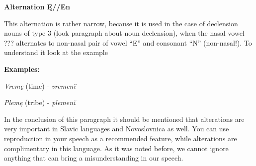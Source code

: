 
\textbf{Alternation Ę//En}

This alternation is rather narrow, because it is used in the case of declension nouns of type 3 (look paragraph about noun declension), when the nasal vowel ??? alternates to non-nasal pair of vowel “E” and consonant “N” (non-nasal!). To understand it look at the example

\textbf{Examples:}

\textit{Vremę} (time) \textipa{[‘vrEmj\~E]} - \textit{vremenï} 

\textit{Plemę} (tribe) \textipa{[‘plEmj\~E]} - \textit{plemenï} 

In the conclusion of this paragraph it should be mentioned that alterations are very important in Slavic languages and Novoslovnica as well. You can use reproduction in your speech as a recommended feature, while alterations are complimentary in this language. As it was noted before, we cannot ignore anything that can bring a misunderstanding in our speech. 
